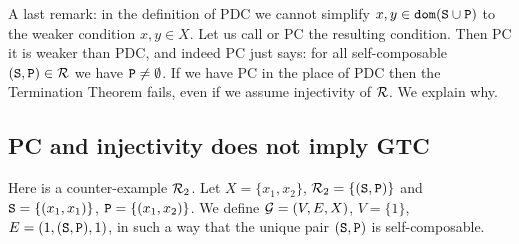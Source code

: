\documentclass{lmcs}
\begin{document}
%

A last remark: in the definition of PDC we cannot simplify 
$x, y \in {\tt dom}({\tt S} \cup {\tt P})$ to the weaker condition
$x, y \in X$. Let us call  or 
PC the resulting condition. Then PC it is weaker than PDC,
and indeed PC just says:
for all self-composable $({\tt S},{\tt P}) \in {\mathcal R}$ we have ${\tt P} \not = \emptyset$.
If we have PC in the place of PDC then the Termination Theorem fails, even if
we assume injectivity
of ${\mathcal R}$. We explain why.

\subsection{PC and injectivity does not imply GTC}
\label{subsubsection-counterexample-PC-PDC}
Here is a counter-example ${\mathcal R}_2$. 
Let $X = \{x_1,x_2\}$, ${\mathcal R}_2=\{({\tt S},{\tt P})\}$
and ${\tt S} =\{(x_1,x_1)\}$, ${\tt P} =\{(x_1,x_2)\}$. 
We define ${\mathcal G}=(V,E,X)$, $V=\{1\}$, $E=(1,({\tt S},{\tt P}),1)$, 
in such a way that the unique pair $({\tt S},{\tt P})$ is self-composable. 
\end{document}
